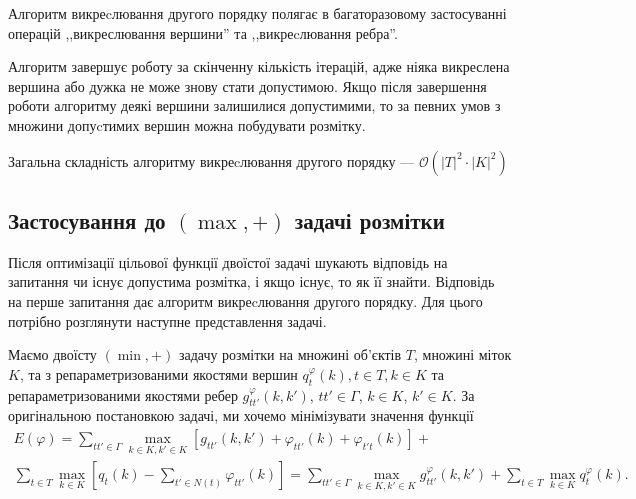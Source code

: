 Алгоритм викреcлювання другого порядку полягає в багаторазовому застосуванні
операцій ,,викреслювання вершини'' та ,,викреcлювання ребра''. 

Алгоритм завершує роботу за скінченну кількість ітерацій, 
адже ніяка викреслена вершина або дужка не може
знову стати допустимою. Якщо після завершення роботи алгоритму деякі вершини
залишилися допустимими, то за певних умов \cite{savchynskyy} з множини допуcтимих вершин можна побудувати розмітку.

Загальна складність алгоритму викреcлювання другого порядку --- $\mathcal{O}(|T|^2\cdot |K|^2)$

\subsection{Застосування до $(\max,+)$ задачі розмітки}

Після оптимізації цільової функції двоїстої задачі шукають відповідь на запитання
чи існує допустима розмітка, і якщо існує, то як її знайти. Відповідь на перше
запитання дає алгоритм викреcлювання другого порядку. Для цього потрібно розглянути
наступне представлення задачі.

Маємо двоїсту $(\min, +)$ задачу розмітки на множині об'єктів $T$, множині 
міток $K$, та з репараметризованими якостями вершин 
$q^\varphi_t(k), t\in T, k\in K$ та репараметризованими якостями ребер
$g^\varphi_{tt'}(k,k')$, $tt'\in\Gamma$, $k\in K$, $k'\in K$.
За оригінальною постановкою задачі, ми хочемо мінімізувати значення
функції
\begin{equation*}
    \begin{aligned}
    E(\varphi) = \sum\limits_{tt'\in\Gamma}\max\limits_{k\in K, k'\in K}[ g_{tt'}(k,k')
    + \varphi_{tt'}(k) + \varphi_{t't}(k)] +\\
    \sum\limits_{t\in T}\max\limits_{k\in K}[ q_t(k) - \sum\limits_{t'\in N(t)} \varphi_{tt'}(k)] =
    \sum\limits_{tt'\in\Gamma}\max\limits_{k\in K, k'\in K}g^\varphi_{tt'}(k,k') + 
    \sum\limits_{t\in T}\max\limits_{k\in K}q^\varphi_t(k).
\end{aligned}
\end{equation*}

